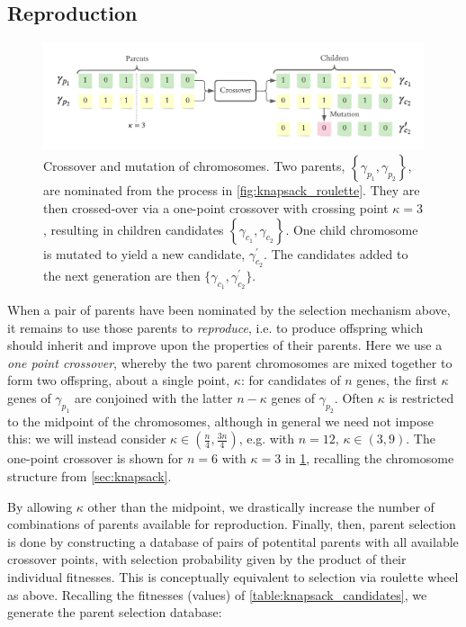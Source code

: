 \subsection{Reproduction}
\label{sec:reproduction}
\begin{figure}
    \begin{center}
        \includegraphics{theoretical_study/figures/chromosomes.pdf}
    \end{center}
    \caption[Crossover and mutation of chromosomes.]{
        Crossover and mutation of chromosomes.
        Two parents, $\left\{\gamma_{p_1}, \gamma_{p_2}\right\}$, are nominated from the process in \cref{fig:knapsack_roulette}. 
        They are then crossed-over via a one-point crossover with crossing point $\kappa=3$, 
        resulting in children candidates $\left\{\gamma_{c_1}, \gamma_{c_2}\right\}$. 
        One child chromosome is mutated to yield a new candidate, $\gamma_{c_2}^{\prime}$. 
        The candidates added to the next generation are then $\{ \gamma_{c_1}, \gamma_{c_2}^{\prime} \}$.
    }
    \label{fig:gen_alg_reproduction}
\end{figure}

When a pair of parents have been nominated by the selection mechanism above, 
    it remains to use those parents to \emph{reproduce}, 
    i.e. to produce offspring which should inherit and improve upon the properties of their parents. 
Here we use a \emph{one point crossover}, whereby the two parent chromosomes are mixed together 
    to form two offspring, about a single point, $\kappa$: 
    for candidates of $n$ genes, 
    the first $\kappa$ genes of $\gamma_{p_1}$ are conjoined with the latter $n - \kappa$ genes of $\gamma_{p_2}$. 
Often $\kappa$ is restricted to the midpoint of the chromosomes, although in general we need not impose this: 
    we will instead consider $\kappa \in \left( \frac{n}{4}, \frac{3n}{4} \right)$, 
    e.g. with $n=12$, $\kappa \in (3, 9)$. 
The one-point crossover is shown for $n=6$ with $\kappa=3$ in \cref{fig:gen_alg_reproduction}, 
    recalling the chromosome structure from \cref{sec:knapsack}.
\par 
By allowing $\kappa$ other than the midpoint, we drastically increase the number of combinations of parents available for reproduction. 
Finally, then, parent selection is done by constructing a database of pairs of potentital parents with all available crossover points, 
    with selection probability given by the product of their individual fitnesses. 
This is conceptually equivalent to selection via roulette wheel as above. 
Recalling the fitnesses (values) of \cref{table:knapsack_candidates}, we generate the parent selection database:

